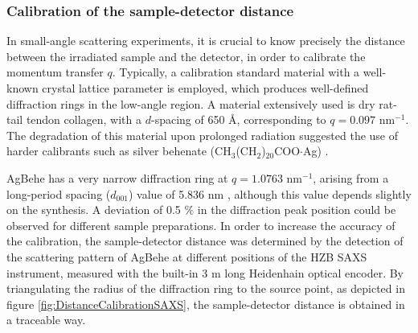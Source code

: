\subsubsection{Calibration of the sample-detector distance}

In small-angle scattering experiments, it is crucial to know precisely the distance between the irradiated sample and the detector, in order to calibrate the momentum transfer $q$. Typically, a calibration standard material with a well-known crystal lattice parameter is employed, which produces well-defined diffraction rings in the low-angle region. A material extensively used is dry rat-tail tendon collagen, with a $d$-spacing of 650 \AA \citep{amenitsch_performance_1997}, corresponding to $q=0.097$ nm$^{-1}$. The degradation of this material upon prolonged radiation suggested the use of harder calibrants such as silver behenate (CH$_3$(CH$_2$)$_{20}$COO$\cdot$Ag) \citep{huang_x-ray_1993}.

AgBehe has a very narrow diffraction ring at $q=1.0763$ nm$^{-1}$, arising from a long-period spacing ($d_{001}$) value of 5.836 nm \citep{blanton_jcpdsinternational_1995}, although this value depends slightly on the synthesis. A deviation of 0.5 $\%$ in the diffraction peak position could be observed for different sample preparations. In order to increase the accuracy of the calibration, the sample-detector distance was determined by the detection of the scattering pattern of AgBehe at different positions of the HZB SAXS instrument, measured with the built-in 3 m long Heidenhain optical encoder. By triangulating the radius of the diffraction ring to the source point, as depicted in figure \ref{fig:DistanceCalibrationSAXS}, the sample-detector distance is obtained in a traceable way.

